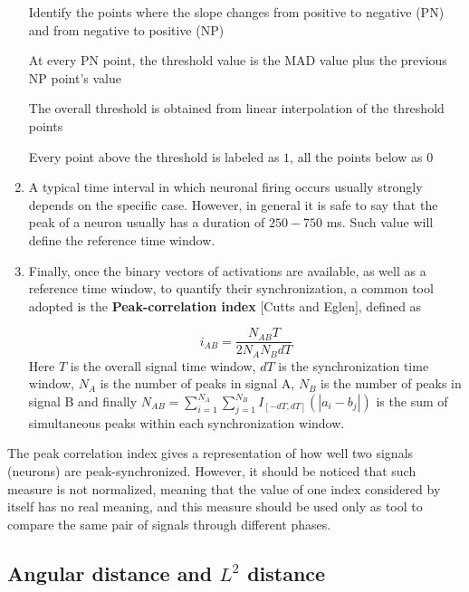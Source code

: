 \documentclass[a4paper]{article}
\begin{document}
\begin{enumerate}
\begin{algorithm}
\begin{algorithmic}[1]
			\State Identify the points where the slope changes from positive to negative (PN) and from negative to positive (NP)
			
			
			\State At every PN point, the threshold value is the MAD value plus the previous NP point's value
			
			\State The overall threshold is obtained from linear interpolation of the threshold points
			
			\State Every point above the threshold is labeled as $1$, all the points below as $0$
		\end{algorithmic}
	\end{algorithm}
	
	\item A typical time interval in which neuronal firing occurs usually strongly depends on the specific case. However, in general it is safe to say that the peak of a neuron usually has a duration of $250-750$ ms. Such value will define the reference time window. 
	
	\item Finally, once the binary vectors of activations are available, as well as a reference time window, to quantify their synchronization, a common tool adopted is the \textbf{Peak-correlation index} [Cutts and Eglen], defined as 
	
	$$ i_{AB} = \frac{N_{AB} T}{2 N_A N_B dT} $$ 
	Here $T $ is the overall signal time window, $dT$ is the synchronization time window, $N_A$ is the number of peaks in signal A, $N_B $ is the number of peaks in signal B and finally $N_{AB} = \sum_{i=1}^{N_A} \sum_{j=1}^{N_B} I_{[-dT,dT]}(|a_i - b_j|) $ is the sum of simultaneous peaks within each synchronization window.
	
\end{enumerate}

The peak correlation index gives a representation of how well two signals (neurons) are peak-synchronized. However, it should be noticed that such measure is not normalized, meaning that the value of one index considered by itself has no real meaning, and this measure should be used only as tool to compare the same pair of signals through different phases.


\subsection{Angular distance and $L^2$ distance}
\end{document}

